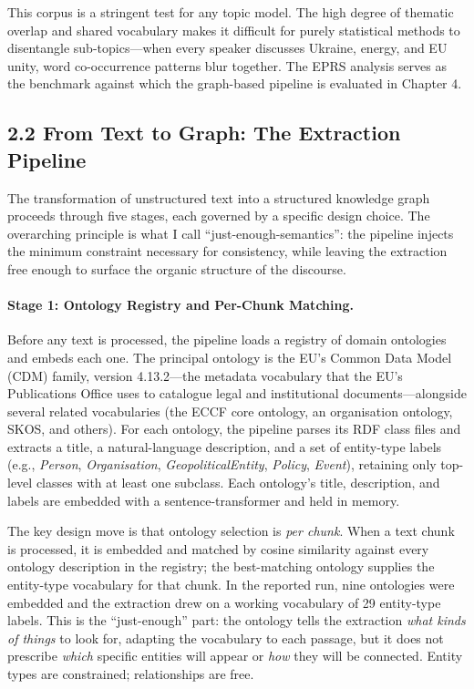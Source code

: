 \documentclass[11pt]{article}
\begin{document}
This corpus is a stringent test for any topic model. The high degree of thematic overlap and shared vocabulary makes it difficult for purely statistical methods to disentangle sub-topics---when every speaker discusses Ukraine, energy, and EU unity, word co-occurrence patterns blur together. The EPRS analysis serves as the benchmark against which the graph-based pipeline is evaluated in Chapter 4.

\subsection{2.2 From Text to Graph: The Extraction Pipeline}

The transformation of unstructured text into a structured knowledge graph proceeds through five stages, each governed by a specific design choice. The overarching principle is what I call ``just-enough-semantics'': the pipeline injects the minimum constraint necessary for consistency, while leaving the extraction free enough to surface the organic structure of the discourse.

\paragraph{Stage 1: Ontology Registry and Per-Chunk Matching.}
Before any text is processed, the pipeline loads a registry of domain ontologies and embeds each one. The principal ontology is the EU's Common Data Model (CDM) family, version 4.13.2---the metadata vocabulary that the EU's Publications Office uses to catalogue legal and institutional documents---alongside several related vocabularies (the ECCF core ontology, an organisation ontology, SKOS, and others). For each ontology, the pipeline parses its RDF class files and extracts a title, a natural-language description, and a set of entity-type labels (e.g., \emph{Person}, \emph{Organisation}, \emph{GeopoliticalEntity}, \emph{Policy}, \emph{Event}), retaining only top-level classes with at least one subclass. Each ontology's title, description, and labels are embedded with a sentence-transformer and held in memory.

The key design move is that ontology selection is \emph{per chunk}. When a text chunk is processed, it is embedded and matched by cosine similarity against every ontology description in the registry; the best-matching ontology supplies the entity-type vocabulary for that chunk. In the reported run, nine ontologies were embedded and the extraction drew on a working vocabulary of 29 entity-type labels. This is the ``just-enough'' part: the ontology tells the extraction \emph{what kinds of things} to look for, adapting the vocabulary to each passage, but it does not prescribe \emph{which} specific entities will appear or \emph{how} they will be connected. Entity types are constrained; relationships are free.
\end{document}
